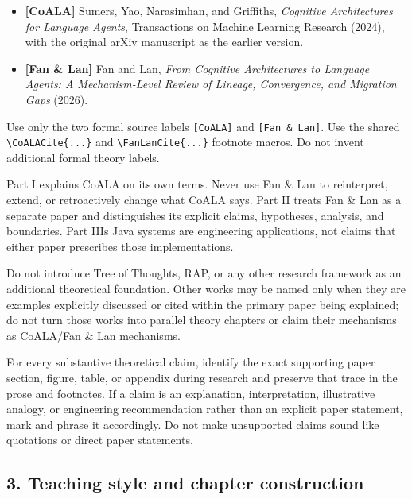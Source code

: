 \begin{itemize}
\tightlist
\item
  \textbf{{[}CoALA{]}} Sumers, Yao, Narasimhan, and Griffiths,
  \emph{Cognitive Architectures for Language Agents}, Transactions on
  Machine Learning Research (2024), with the original arXiv manuscript
  as the earlier version.
\item
  \textbf{{[}Fan \& Lan{]}} Fan and Lan, \emph{From Cognitive
  Architectures to Language Agents: A Mechanism-Level Review of Lineage,
  Convergence, and Migration Gaps} (2026).
\end{itemize}

Use only the two formal source labels \texttt{{[}CoALA{]}} and
\texttt{{[}Fan\ \&\ Lan{]}}. Use the shared
\texttt{\textbackslash{}CoALACite\{...\}} and
\texttt{\textbackslash{}FanLanCite\{...\}} footnote macros. Do not
invent additional formal theory labels.

Part I explains CoALA on its own terms. Never use Fan \& Lan to
reinterpret, extend, or retroactively change what CoALA says. Part II
treats Fan \& Lan as a separate paper and distinguishes its explicit
claims, hypotheses, analysis, and boundaries. Part III\textquotesingle s
Java systems are engineering applications, not claims that either paper
prescribes those implementations.

Do not introduce Tree of Thoughts, RAP, or any other research framework
as an additional theoretical foundation. Other works may be named only
when they are examples explicitly discussed or cited within the primary
paper being explained; do not turn those works into parallel theory
chapters or claim their mechanisms as CoALA/Fan \& Lan mechanisms.

For every substantive theoretical claim, identify the exact supporting
paper section, figure, table, or appendix during research and preserve
that trace in the prose and footnotes. If a claim is an explanation,
interpretation, illustrative analogy, or engineering recommendation
rather than an explicit paper statement, mark and phrase it accordingly.
Do not make unsupported claims sound like quotations or direct paper
statements.

\subsection{3. Teaching style and chapter
construction}\label{3-teaching-style-and-chapter-construction}

